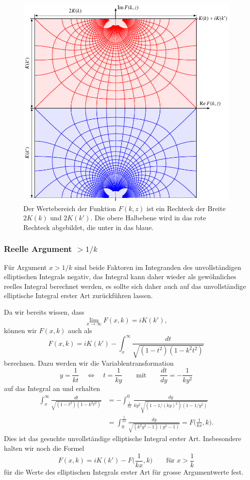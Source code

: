 \begin{figure}
\centering
\includegraphics{chapters/110-elliptisch/images/rechteck.pdf}
\caption{Der Wertebereich der Funktion $F(k,z)$ ist ein Rechteck
der Breite $2K(k)$ und $2K(k')$.
Die obere Halbebene wird in das rote Rechteck abgebildet, die unter
in das blaue.
\label{buch:elliptisch:fig:rechteck}}
\end{figure}

%
%
\subsubsection{Reelle Argument $> 1/k$}
Für Argument $x> 1/k$ sind beide Faktoren im Integranden des 
unvollständigen elliptischen Integrals negativ, das Integral kann
daher wieder als gewöhnliches reelles Integral berechnet werden,
es sollte sich daher auch auf das unvollständige elliptische Integral
erster Art zurückführen lassen.

Da wir bereits wissen, dass 
\[
\lim_{x\to\infty} F(x,k) = iK(k'),
\]
können wir $F(x,k)$ auch als
\[
F(x,k)
=
iK(k')
-
\int_x^\infty \frac{dt}{\sqrt{(1-t^2)(1-k^2t^2)}}
\]
berechnen.
Dazu werden wir die Variablentransformation
\[
y=\frac{1}{kt}\quad\Leftrightarrow\quad t=\frac{1}{ky}
\qquad\text{mit}\qquad
\frac{dt}{dy} = -\frac{1}{ky^2}
\]
auf das Integral an und erhalten
\begin{align*}
\int_x^\infty \frac{dt}{\sqrt{(1-t^2)(1-k^2t^2)}}
&=
-\int_{\frac1{kx}}^0 \frac{dy}{ky^2\sqrt{(1-1/(ky)^2)(1-1/y^2)}}
\\
&=
\int_0^{\frac{1}{kx}} \frac{dy}{\sqrt{(k^2y^2-1)(y^2-1)}}
=
F\biggl(\frac{1}{kx},k\biggr).
\end{align*}
Dies ist das gesuchte unvollständige elliptische Integral erster Art.
Insbesondere halten wir noch die Formel
\[
F(x,k) = iK(k') - F\biggl(\frac1{kx},k\biggr)
\qquad\text{für $x>\frac1k$}
\]
für die Werte des elliptischen Integrals erster Art für grosse Argumentwerte
fest.

